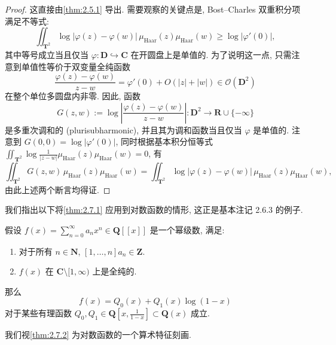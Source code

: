 \begin{proof}
这直接由\autoref{thm:2.5.1} 导出. 
需要观察的关键点是, Bost--Charles 双重积分项满足不等式:
\begin{equation*}
\iint_{\mathbf{T}^2} \log |\varphi(z) - \varphi(w)| \, \mu_{\mathrm{Haar}}(z) \mu_{\mathrm{Haar}}(w) \ge \log |\varphi'(0)|,
\end{equation*}
其中等号成立当且仅当 \(\varphi : \mathbf{D} \hookrightarrow \mathbf{C}\) 在开圆盘上是单值的. 
为了说明这一点, 只需注意到单值性等价于双变量全纯函数
\[ \frac{\varphi(z) - \varphi(w)}{z - w} = \varphi'(0) + O(|z| + |w|) \in \mathcal{O}(\mathbf{D}^2) \]
在整个单位多圆盘内非零. 
因此, 函数
\[ G(z,w) := \log \left| \frac{\varphi(z) - \varphi(w)}{z - w} \right| : \mathbf{D}^2 \to \mathbf{R} \cup \{-\infty\} \]
是多重次调和的 (plurisubharmonic), 并且其为调和函数当且仅当 \(\varphi\) 是单值的. 
注意到 \(G(0,0) = \log |\varphi'(0)|\), 同时根据基本积分恒等式 \(\iint_{\mathbf{T}^2} \log \frac{1}{|z-w|} \mu_{\text{Haar}}(z) \mu_{\text{Haar}}(w) = 0\), 有
\[ \iint_{\mathbf{T}^2} G(z, w) \, \mu_{\text{Haar}}(z) \mu_{\text{Haar}}(w) = \iint_{\mathbf{T}^2} \log |\varphi(z) - \varphi(w)| \, \mu_{\text{Haar}}(z) \mu_{\text{Haar}}(w), \]
由此上述两个断言均得证.
\end{proof}

我们指出以下将\autoref{thm:2.7.1} 应用到对数函数的情形, 这正是基本注记 2.6.3 的例子.

\begin{theorem}\label{thm:2.7.2}
假设 \(f(x) = \sum_{n=0}^{\infty} a_n x^n \in \mathbf{Q}[\! [x]\!]\) 是一个幂级数, 满足:
\begin{enumerate}
  \item[(1)] 对于所有 \(n \in \mathbf{N}\), \([1, \dots, n]a_n \in \mathbf{Z}\).
  \item[(2)] \(f(x)\) 在 \(\mathbf{C} \setminus [1, \infty)\) 上是全纯的.
\end{enumerate}
那么
\[ f(x) = Q_0(x) + Q_1(x)\log(1-x) \]
对于某些有理函数 \(Q_0, Q_1 \in \mathbf{Q}\left[x, \frac{1}{1-x}\right] \subset \mathbf{Q}(x)\) 成立.
\end{theorem}

我们视\autoref{thm:2.7.2} 为对数函数的一个算术特征刻画.

